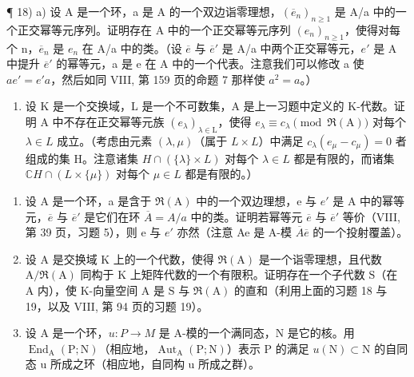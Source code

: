 ¶ 18) a) 设 A 是一个环，a 是 A 的一个双边诣零理想，\((\overline{e}_{n})_{n\geqslant1}\) 是 A/a 中的一个正交幂等元序列。证明存在 A 中的一个正交幂等元序列 \((e_{n})_{n\geqslant1}\)，使得对每个 n，\(\overline{e}_{n}\) 是 \(e_{n}\) 在 A/a 中的类。（设 \(\overline{e}\) 与 \(\overline{e}'\) 是 A/a 中两个正交幂等元，\(e'\) 是 A 中提升 \(\overline{e}'\) 的幂等元，a 是 e 在 A 中的一个代表。注意我们可以修改 a 使 \(ae' = e'a\)，然后如同 VIII, 第 159 页的命题 7 那样使 \(a^{2} = a\)。）

\begin{enumerate}
\def\labelenumi{\alph{enumi})}
\setcounter{enumi}{1}
\tightlist
\item
  设 K 是一个交换域，L 是一个不可数集，A 是上一习题中定义的 K-代数。证明 A 中不存在正交幂等元族 \((e_{\lambda})_{\lambda\in\mathrm{L}}\)，使得 \(e_{\lambda}\equiv c_{\lambda} \pmod{\Re(\mathrm{A})}\) 对每个 \(\lambda\in L\) 成立。（考虑由元素 \((\lambda,\mu)\)（属于 \(L\times L\)）中满足 \(c_{\lambda}(e_{\mu}-c_{\mu})=0\) 者组成的集 H。注意诸集 \(H\cap(\{\lambda\}\times L)\) 对每个 \(\lambda\in L\) 都是有限的，而诸集 \(\mathbb{C}H\cap(L\times\{\mu\})\) 对每个 \(\mu\in L\) 都是有限的。）
\end{enumerate}

\begin{enumerate}
\def\labelenumi{\arabic{enumi})}
\setcounter{enumi}{18}
\item
  设 A 是一个环，a 是含于 \(\Re(\mathrm{A})\) 中的一个双边理想，e 与 \(e'\) 是 A 中的幂等元，\(\overline{e}\) 与 \(\overline{e}'\) 是它们在环 \(\overline{A} = A/a\) 中的类。证明若幂等元 \(\overline{e}\) 与 \(\overline{e}'\) 等价（VIII, 第 39 页，习题 5），则 e 与 \(e'\) 亦然（注意 Ae 是 A-模 \(\overline{A}\overline{e}\) 的一个投射覆盖）。
\item
  设 \(\mathrm{A}\) 是交换域 \(\mathrm{K}\) 上的一个代数，使得 \(\Re(\mathrm{A})\) 是一个诣零理想，且代数 \(\mathrm{A} / \Re(\mathrm{A})\) 同构于 \(\mathrm{K}\) 上矩阵代数的一个有限积。证明存在一个子代数 \(\mathrm{S}\)（在 \(\mathrm{A}\) 内），使 \(\mathrm{K}\)-向量空间 \(\mathrm{A}\) 是 \(\mathrm{S}\) 与 \(\Re(\mathrm{A})\) 的直和（利用上面的习题 18 与 19，以及 VIII, 第 94 页的习题 19）。
\item
  设 A 是一个环，\(u: P \to M\) 是 A-模的一个满同态，N 是它的核。用 \(\operatorname{End}_{\mathrm{A}}(\mathrm{P}; \mathrm{N})\)（相应地，\(\operatorname{Aut}_{\mathrm{A}}(\mathrm{P}; \mathrm{N})\)）表示 P 的满足 \(u(\mathrm{N}) \subset \mathrm{N}\) 的自同态 u 所成之环（相应地，自同构 u 所成之群）。
\end{enumerate}

